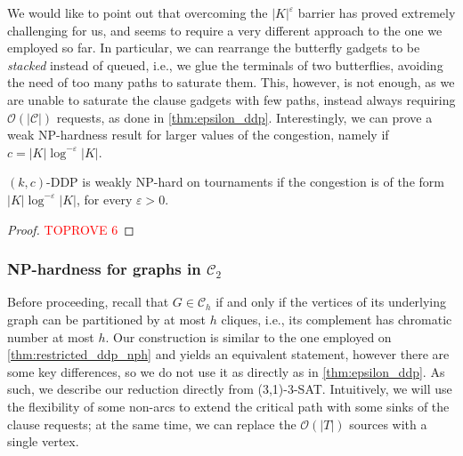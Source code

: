 \documentclass[a4paper,UKenglish,cleveref, autoref, thm-restate]{lipics-v2021}
\renewcommand{\NP}{{\sf NP}\xspace}
\newcommand{\pname}[1]{{\sc #1}}
\newcommand{\bigO}[1]{\mathcal{O}\!\left(#1\right)}
\newcommand{\congestion}{c}
\begin{document}
  We would like to point out that overcoming the $|K|^\varepsilon$ barrier has proved extremely
  challenging for us, and seems to require a very different approach to the one we employed so far.
  In particular, we can rearrange the butterfly gadgets to be \textit{stacked}
  instead of queued, i.e., we glue the terminals of two butterflies, avoiding the need of
  too many paths to saturate them. This, however, is not enough, as we are unable to
  saturate the clause gadgets with few paths, instead always requiring
  $\bigO{|\mathcal{C}|}$ requests, as done in \autoref{thm:epsilon_ddp}.
  Interestingly, we can prove a weak \NP-hardness result for larger values of the
  congestion, namely if $\congestion = |K|\log^{-\varepsilon} |K|$.

  \begin{theorem}
    \label{thm:log_ratio_ddp}
    \pname{$(k,c)$-DDP} is weakly \NP-hard on tournaments if
    the congestion is of the form $|K|\log^{-\varepsilon} |K|$, for every $\varepsilon > 0$.
  \end{theorem}

  \begin{proof}\textcolor{red}{TOPROVE 6}\end{proof} \subsubsection{\NP-hardness for graphs in $\mathcal{C}_2$}
\label{sec:ch_nph}
Before proceeding, recall that $G \in \mathcal{C}_h$ if and only if the vertices of its underlying graph can be partitioned by at most $h$ cliques, i.e., its complement has chromatic number at most $h$.
Our construction is similar to the one employed on \autoref{thm:restricted_ddp_nph}
and yields an equivalent statement, however there are some key differences, so we
do not use it as directly as in \autoref{thm:epsilon_ddp}.
As such, we describe our reduction directly from \pname{(3,1)-3-SAT}.
Intuitively, we will use the flexibility of some non-arcs to extend the critical path with
some sinks of the clause requests; at the same time, we can replace the $\bigO{|T|}$ sources
with a single vertex.
\end{document}
